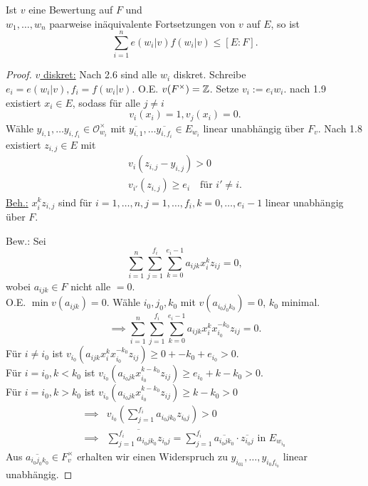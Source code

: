 \begin{theorem}
    Ist $v$ eine Bewertung auf $F$ und \\$w_1,\ldots,w_n$ paarweise inäquivalente Fortsetzungen von $v$ auf $E$,
    so ist 
    $$ \sum\limits_{i=1}^n e(w_i|v)f(w_i|v) \leq [E:F].$$
\end{theorem}
\begin{proof}
    \underline{$v$ diskret:} Nach 2.6 sind alle $w_i$ diskret.
    Schreibe $e_i=e(w_i|v), f_i=f(w_i|v)$.
    O.E. $v(F^\times) = \mathbb{Z}$. Setze $v_i := e_iw_i$.
    nach 1.9 existiert $x_i \in E$, sodass für alle $j \ne i$ 
    $$v_i(x_i)=1, v_j(x_i)=0.$$
    Wähle $y_{i,1},\ldots y_{i,f_i} \in \mathcal{O}_{w_i}^\times$ mit $\overline{y_{i,1}}, \ldots \overline{y_{i,f_i}} \in E_{w_i}$
    linear unabhängig über $F_v$.
    Nach 1.8 existiert $z_{i,j} \in E$ mit 
    \begin{align*}
        v_i(z_{i,j}-y_{i,j})>0 \\
        v_{i'}(z_{i,j}) \geq e_i \quad \text{für } i' \neq i.
    \end{align*}
    \underline{Beh.:} $x_i^kz_{i,j}$ sind für $i=1,\ldots,n,j=1,\ldots,f_i,k=0,\ldots,e_i -1$ linear unabhängig über $F$.

    Bew.: Sei $$ \sum\limits_{i=1}^n\sum\limits_{j=1}^{f_i}\sum\limits_{k=0}^{e_i-1} a_{ijk}x_i^kz_{ij}=0,$$
    wobei $a_{ijk} \in F$ nicht alle $=0$.\\
    O.E. $\min v(a_{ijk})=0$.
    Wähle $i_0,j_0,k_0$ mit $v(a_{i_0j_0k_0})=0$, $k_0$ minimal.
    $$ \implies \sum\limits_{i=1}^n\sum\limits_{j=1}^{f_i}\sum\limits_{k=0}^{e_i-1} a_{ijk}x_i^kx_{i_0}^{-k_0}z_{ij}=0.$$
    Für $i\ne i_0$ ist $v_{i_0}(a_{ijk}x_i^kx_{i_0}^{-k_0}z_{ij}) \geq 0 + -k_0 + e_{i_0} > 0$.\\
    Für $i = i_0, k < k_0$ ist $v_{i_0}(a_{i_0jk}x_{i_0}^{k-k_0}z_{ij}) \geq e_{i_0} + k - k_0 > 0$.\\
    Für $i=i_0, k > k_0$ ist $v_{i_0}(a_{i_0jk}x_{i_0}^{k-k_0}z_{ij}) \geq k - k_0 > 0$
    \begin{align*}
        \implies & v_{i_0}(\sum\limits_{j=1}^{f_i}a_{i_0jk_0}z_{i_0j}) > 0\\
        \implies & \overline{\sum\limits_{j=1}^{f_i}a_{i_0jk_0}z_{i_0j}} = \sum\limits_{j=1}^{f_i}\overline{a_{i_0jk_0}}\cdot \overline{z_{i_0j}} \text{ in } E_{w_{i_0}}
    \end{align*}
    Aus $ \overline{a_{i_0j_0k_0}}\in F_v^\times$ erhalten wir einen Widerspruch zu $y_{i_01},\ldots,y_{i_0f_{i_0}}$ linear unabhängig.
\end{proof}

